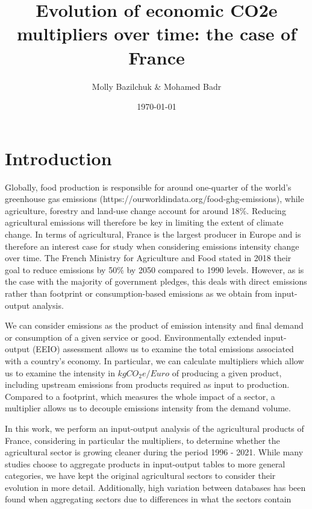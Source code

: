 \documentclass[a4paper,twoside]{article}
\title{Evolution of economic CO2e multipliers over time: the case of France}
\author{Molly Bazilchuk & Mohamed Badr}
\date{\today}
\begin{document}
\maketitle
\vspace{3cm}


\section{Introduction}

Globally, food production is responsible for around one-quarter of the world's greenhouse gas emissions (https://ourworldindata.org/food-ghg-emissions), while agriculture, forestry and land-use change account for around 18\%. Reducing agricultural emissions will therefore be key in limiting the extent of climate change. In terms of agricultural, France is the largest producer in Europe and is therefore an interest case for study when considering emissions intensity change over time. The French Ministry for Agriculture and Food stated in 2018 their goal to reduce emissions by 50\% by 2050 compared to 1990 levels. However, as is the case with the majority of government pledges, this deals with direct emissions rather than footprint or consumption-based emissions as we obtain from input-output analysis. 

We can consider emissions as the product of emission intensity and final demand or consumption of a given service or good. Environmentally extended input-output (EEIO) assessment allows us to examine the total emissions associated with a country's economy. In particular, we can calculate multipliers which allow us to examine the intensity in $kgCO_2e/Euro$ of producing a given product, including upstream emissions from products required as input to production. Compared to a footprint, which measures the whole impact of a sector, a multiplier allows us to decouple emissions intensity from the demand volume.

In this work, we perform an input-output analysis of the agricultural products of France, considering in particular the multipliers, to determine whether the agricultural sector is growing cleaner during the period 1996 - 2021. While many studies choose to aggregate products in input-output tables to more general categories, we have kept the original agricultural sectors to consider their evolution in more detail. Additionally, high variation between databases has been found when aggregating sectors due to differences in what the sectors contain \cite{Steen-Olsen2014}
\end{document}
